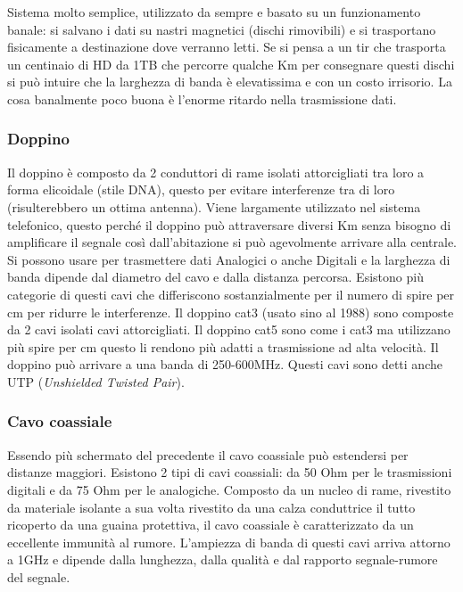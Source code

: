 Sistema molto semplice, utilizzato da sempre e basato su un funzionamento banale: si salvano i dati su nastri magnetici (dischi rimovibili) e si trasportano fisicamente a destinazione dove verranno letti. Se si pensa a un tir che trasporta un centinaio di HD da 1TB che percorre qualche Km per consegnare questi dischi si può intuire che la larghezza di banda è elevatissima e con un costo irrisorio. La cosa banalmente poco buona è l'enorme ritardo nella trasmissione dati.

\subsubsection{Doppino}

Il doppino è composto da 2 conduttori di rame isolati attorcigliati tra loro a forma elicoidale (stile DNA), questo per evitare interferenze tra di loro (risulterebbero un ottima antenna). Viene largamente utilizzato nel sistema telefonico, questo perché il doppino può attraversare diversi Km senza bisogno di amplificare il segnale così dall'abitazione si può agevolmente arrivare alla centrale. Si possono usare per trasmettere dati Analogici o anche Digitali e la larghezza di banda dipende dal diametro del cavo e dalla distanza percorsa. Esistono più categorie di questi cavi che differiscono sostanzialmente per il numero di spire per cm per ridurre le interferenze. Il doppino cat3 (usato sino al 1988) sono composte da 2 cavi isolati cavi attorcigliati. Il doppino cat5 sono come i cat3 ma utilizzano più spire per cm questo li rendono più adatti a trasmissione ad alta velocità. Il doppino può arrivare a una banda di 250-600MHz. Questi cavi sono detti anche UTP (\textit{Unshielded Twisted Pair}).

\subsubsection{Cavo coassiale}

Essendo più schermato del precedente il cavo coassiale può estendersi per distanze maggiori. Esistono 2 tipi di cavi coassiali: da 50 Ohm per le trasmissioni digitali e da 75 Ohm per le analogiche.
Composto da un nucleo di rame, rivestito da materiale isolante a sua volta rivestito da una calza conduttrice il tutto ricoperto da una guaina protettiva, il cavo coassiale è caratterizzato da un eccellente immunità al rumore. L'ampiezza di banda di questi cavi arriva attorno a 1GHz e dipende dalla lunghezza, dalla qualità e dal rapporto segnale-rumore del segnale.

